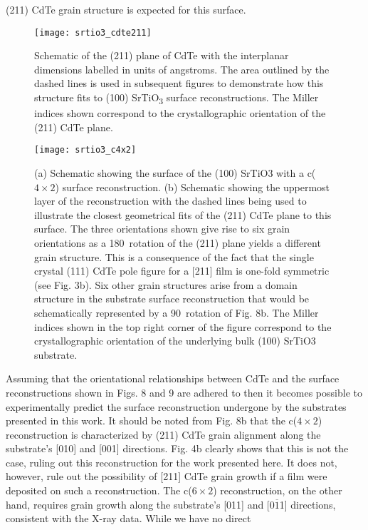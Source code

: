 (211) CdTe grain structure is expected for this surface.
\begin{figure}
    \centering
    \texttt{[image: srtio3\_cdte211]}
    \caption{\label{figLsrtio3_cdte211}Schematic of the (211) plane of CdTe with the interplanar dimensions
        labelled in units of angstroms. The area outlined by the dashed lines is used in
        subsequent figures to demonstrate how this structure fits to (100) SrTiO\textsubscript{3} surface
        reconstructions. The Miller indices shown correspond to the crystallographic
        orientation of the (211) CdTe plane.}
\end{figure}
\begin{figure}
    \centering
    \texttt{[image: srtio3\_c4x2]}
    \caption{\label{fig:srtio3_c4x2}(a) Schematic showing the surface of the (100) SrTiO3 with a c($4\times2$) surface reconstruction. (b) Schematic showing the uppermost layer of the reconstruction with the dashed lines being used to illustrate the closest geometrical fits of the (211) CdTe plane to this surface. The three orientations shown give rise to six grain orientations as a 180\degree~rotation of the (211) plane yields a different grain structure. This is a consequence of the fact that the single crystal (111) CdTe pole figure for a [211] film is one-fold symmetric (see Fig. 3b). Six other grain structures arise from a domain structure in the substrate surface reconstruction that would be schematically represented by a 90\degree~rotation of Fig. 8b. The Miller indices shown in the top right corner of the figure correspond to the crystallographic orientation of the underlying bulk (100) SrTiO3 substrate.}
\end{figure}
Assuming that the orientational relationships between CdTe
and the surface reconstructions shown in Figs. 8 and 9 are adhered
to then it becomes possible to experimentally predict the surface
reconstruction undergone by the substrates presented in this
work. It should be noted from Fig. 8b that the c($4\times2$)
reconstruction is characterized by (211) CdTe grain alignment
along the substrate’s [010] and [001] directions. Fig. 4b clearly
shows that this is not the case, ruling out this reconstruction for the
work presented here. It does not, however, rule out the possibility
of [211] CdTe grain growth if a film were deposited on such a
reconstruction. The c($6\times2$) reconstruction, on the other hand,
requires grain growth along the substrate’s [011] and [0$\overline{1}$1]
directions, consistent with the X-ray data. While we have no direct
